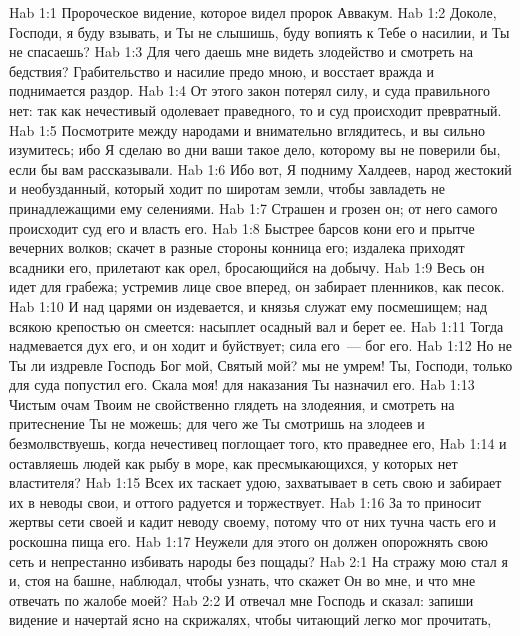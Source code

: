 \vs Hab 1:1 Пророческое видение, которое видел пророк Аввакум.
\rsbpar\vs Hab 1:2 Доколе, Господи, я буду взывать, и Ты не слышишь, буду вопиять к Тебе о насилии, и Ты не спасаешь?
\vs Hab 1:3 Для чего даешь мне видеть злодейство и смотреть на бедствия? Грабительство и насилие предо мною, и восстает вражда и поднимается раздор.
\vs Hab 1:4 От этого закон потерял силу, и суда правильного нет: так как нечестивый одолевает праведного, то и суд происходит превратный.
\vs Hab 1:5 Посмотрите между народами и внимательно вглядитесь, и вы сильно изумитесь; ибо Я сделаю во дни ваши такое дело, которому вы не поверили бы, если бы вам рассказывали.
\vs Hab 1:6 Ибо вот, Я подниму Халдеев, народ жестокий и необузданный, который ходит по широтам земли, чтобы завладеть не принадлежащими ему селениями.
\vs Hab 1:7 Страшен и грозен он; от него самого происходит суд его и власть его.
\vs Hab 1:8 Быстрее барсов кони его и прытче вечерних волков; скачет в разные стороны конница его; издалека приходят всадники его, прилетают как орел, бросающийся на добычу.
\vs Hab 1:9 Весь он идет для грабежа; устремив лице свое вперед, он забирает пленников, как песок.
\vs Hab 1:10 И над царями он издевается, и князья служат ему посмешищем; над всякою крепостью он смеется: насыплет осадный вал и берет ее.
\vs Hab 1:11 Тогда надмевается дух его, и он ходит и буйствует; сила его~--- бог его.
\vs Hab 1:12 Но не Ты ли издревле Господь Бог мой, Святый мой? мы не умрем! Ты, Господи, только для суда попустил его. Скала моя! для наказания Ты назначил его.
\vs Hab 1:13 Чистым очам Твоим не свойственно глядеть на злодеяния, и смотреть на притеснение Ты не можешь; для чего же Ты смотришь на злодеев и безмолвствуешь, когда нечестивец поглощает того, кто праведнее его,
\vs Hab 1:14 и оставляешь людей как рыбу в море, как пресмыкающихся, у которых нет властителя?
\vs Hab 1:15 Всех их таскает удою, захватывает в сеть свою и забирает их в неводы свои, и оттого радуется и торжествует.
\vs Hab 1:16 За то приносит жертвы сети своей и кадит неводу своему, потому что от них тучна часть его и роскошна пища его.
\vs Hab 1:17 Неужели для этого он должен опорожнять свою сеть и непрестанно избивать народы без пощады?
\vs Hab 2:1 На стражу мою стал я и, стоя на башне, наблюдал, чтобы узнать, что скажет Он во мне, и что мне отвечать по жалобе моей?
\vs Hab 2:2 И отвечал мне Господь и сказал: запиши видение и начертай ясно на скрижалях, чтобы читающий легко мог прочитать,
